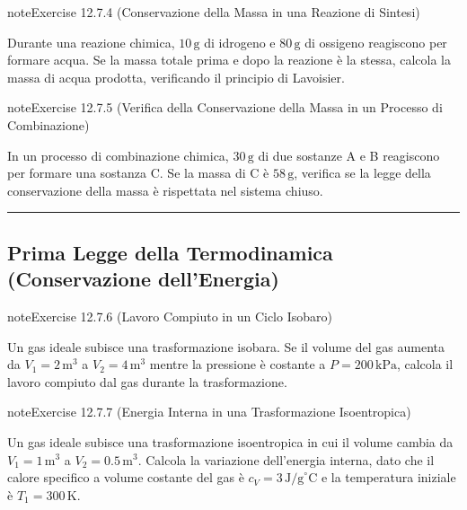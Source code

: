 \documentclass[letterpaper,10pt,italian]{jupyterBook}
\begin{document}
\begin{sphinxadmonition}{note}{Exercise 12.7.4 (Conservazione della Massa in una Reazione di Sintesi)}



\sphinxAtStartPar
Durante una reazione chimica, \(10 \, \text{g}\) di idrogeno e \(80 \, \text{g}\) di ossigeno reagiscono per formare acqua. Se la massa totale prima e dopo la reazione è la stessa, calcola la massa di acqua prodotta, verificando il principio di Lavoisier.
\end{sphinxadmonition}
 \label{exercise:ch/thermodynamics/principles-problems-exercise-4}

\begin{sphinxadmonition}{note}{Exercise 12.7.5 (Verifica della Conservazione della Massa in un Processo di Combinazione)}



\sphinxAtStartPar
In un processo di combinazione chimica, \(30 \, \text{g}\) di due sostanze A e B reagiscono per formare una sostanza C. Se la massa di C è \(58 \, \text{g}\), verifica se la legge della conservazione della massa è rispettata nel sistema chiuso.
\end{sphinxadmonition}


\bigskip\hrule\bigskip



\subsection{Prima Legge della Termodinamica (Conservazione dell’Energia)}
\label{\detokenize{ch/thermodynamics/principles-problems:prima-legge-della-termodinamica-conservazione-dell-energia}} \label{exercise:ch/thermodynamics/principles-problems-exercise-5}

\begin{sphinxadmonition}{note}{Exercise 12.7.6 (Lavoro Compiuto in un Ciclo Isobaro)}



\sphinxAtStartPar
Un gas ideale subisce una trasformazione isobara. Se il volume del gas aumenta da \(V_1 = 2 \, \text{m}^3\) a \(V_2 = 4 \, \text{m}^3\) mentre la pressione è costante a \(P = 200 \, \text{kPa}\), calcola il lavoro compiuto dal gas durante la trasformazione.
\end{sphinxadmonition}
 \label{exercise:ch/thermodynamics/principles-problems-exercise-6}

\begin{sphinxadmonition}{note}{Exercise 12.7.7 (Energia Interna in una Trasformazione Isoentropica)}



\sphinxAtStartPar
Un gas ideale subisce una trasformazione isoentropica in cui il volume cambia da \(V_1 = 1 \, \text{m}^3\) a \(V_2 = 0.5 \, \text{m}^3\). Calcola la variazione dell’energia interna, dato che il calore specifico a volume costante del gas è \(c_V = 3 \, \text{J/g}^\circ \text{C}\) e la temperatura iniziale è \(T_1 = 300 \, \text{K}\).
\end{sphinxadmonition}
 \label{exercise:ch/thermodynamics/principles-problems-exercise-7}
\end{document}
